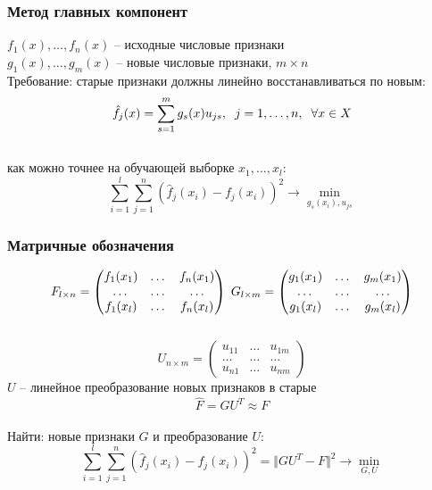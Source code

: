 \documentclass[10pt]{beamer}
\begin{document}
\begin{frame}\frametitle{Метод главных компонент}
$f_1(x), \dots, f_n(x)$ -- исходные числовые признаки\\
$g_1(x), \dots, g_m(x)$ -- новые числовые признаки, $m \times n$\\
Требование: старые признаки должны линейно
восстанавливаться по новым:\\
$$\hat{f}_j(x) = \sum\limits_{s=1}^m g_s(x) u_{js} , \hspace{2mm} j = 1,\dots , n, \hspace{2mm} \forall x \in X$$\\
как можно точнее на обучающей выборке $x_1, \dots, x_l$:\\
$$\sum\limits_{i=1}^l \sum\limits_{j=1}^n (\hat{f}_j(x_i) - f_j(x_i))^2 \rightarrow \min\limits_{g_s(x_i), u_{js}}$$
\end{frame}

\begin{frame}\frametitle{Матричные обозначения}
$$F_{l \times n} = \begin{pmatrix}
  f_1(x_1) & \dots & f_n(x_1) \\
  \dots & \dots & \dots\\
  f_1(x_l) & \dots & f_n(x_l)
 \end{pmatrix} \hspace{1mm} G_{l \times m} = \begin{pmatrix}
  g_1(x_1) & \dots & g_m(x_1) \\
  \dots & \dots & \dots\\
  g_1(x_l) & \dots & g_m(x_l)
 \end{pmatrix}$$\\
 $$U_{n \times m} = \begin{pmatrix}
  u_{11} & \dots & u_{1m} \\
  \dots & \dots & \dots\\
  u_{n1} & \dots & u_{nm}
 \end{pmatrix}$$
$U$ -- линейное преобразование новых признаков в старые\\
$$\hat{F} = GU^T \approx F$$\\
Найти: новые признаки $G$ и преобразование $U$:\\
$$\sum\limits_{i=1}^l \sum\limits_{j=1}^n (\hat{f}_j(x_i) - f_j(x_i))^2 = \Vert GU^T - F \Vert^2 \rightarrow \min\limits_{G, U}$$
\end{frame}
\end{document}
